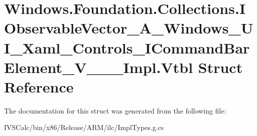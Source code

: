 \hypertarget{struct_windows_1_1_foundation_1_1_collections_1_1_i_observable_vector___a___windows___u_i___xamla3ede4f0a57488afb5ce5adde3cc4814}{}\section{Windows.\+Foundation.\+Collections.\+I\+Observable\+Vector\+\_\+\+A\+\_\+\+Windows\+\_\+\+U\+I\+\_\+\+Xaml\+\_\+\+Controls\+\_\+\+I\+Command\+Bar\+Element\+\_\+\+V\+\_\+\+\_\+\+\_\+\+Impl.\+Vtbl Struct Reference}
\label{struct_windows_1_1_foundation_1_1_collections_1_1_i_observable_vector___a___windows___u_i___xamla3ede4f0a57488afb5ce5adde3cc4814}


The documentation for this struct was generated from the following file\+:\begin{DoxyCompactItemize}
\item 
I\+V\+S\+Calc/bin/x86/\+Release/\+A\+R\+M/ilc/Impl\+Types.\+g.\+cs\end{DoxyCompactItemize}
